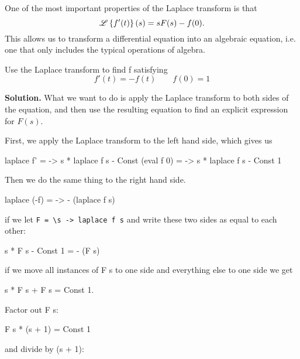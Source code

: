 One of the most important properties of the Laplace transform is that
\begin{equation*}
    \mathscr{L} \left\{ f'(t)\right\} (s) = s F(s) - f(0).
\end{equation*}
This allows us to transform a differential equation into an algebraic equation, i.e. one that only includes the typical operations of algebra.


\begin{example}
Use the Laplace transform to find f satisfying 
\begin{equation*}
    f'(t) = - f(t) \qquad f(0) = 1
\end{equation*} 

\textbf{Solution.} 
What we want to do is apply the Laplace transform to both sides of the equation, and then use the resulting equation to find an explicit expression for $F(s)$. 

First, we apply the Laplace transform to the left hand side, which gives us 
\begin{codeeq} 
laplace f' = \s -> s * laplace f s - Const (eval f 0)
            = \s -> s * laplace f s - Const 1 
\end{codeeq} %

Then we do the same thing to the right hand side. 
\begin{codeeq}
laplace (-f) = \s -> - (laplace f s) 
\end{codeeq} 

if we let \verb|F = \s -> laplace f s| and write these two sides as equal to each other: 

\begin{codeeq} 
s * F s - Const 1 = - (F s)
\end{codeeq} 

if we move all instances of F s to one side and everything else to one side we get

\begin{codeeq}
s * F s + F s = Const 1.
\end{codeeq}
Factor out F s:

\begin{codeeq}
F s * (s + 1) = Const 1
\end{codeeq} 
and divide by (s + 1):


\end{example}
